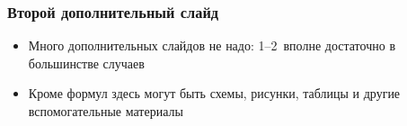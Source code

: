 \documentclass
  [ russian
  , aspectratio=169 %
  ] {beamer}
\begin{document}
\begin{frame}
    \frametitle{Второй дополнительный слайд}
    \begin{itemize}
        \item Много дополнительных слайдов не надо: 1--2~вполне достаточно в большинстве случаев
        \item Кроме формул здесь могут быть схемы, рисунки, таблицы и другие вспомогательные материалы
    \end{itemize}

\end{frame}
\end{document}
